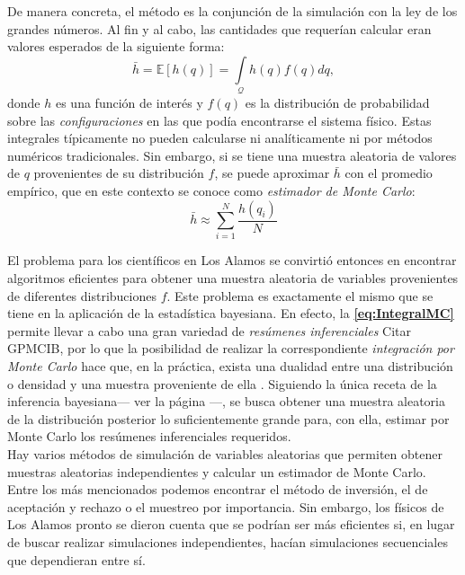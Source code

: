 De manera concreta, el método es la conjunción de la simulación con la ley de los grandes números. Al fin y al cabo, las cantidades que requerían calcular eran valores esperados de la siguiente forma: 
\begin{equation}
\label{eq:IntegralMC}
\bar{h} = \mathbb{E}[h(q)]=\int\limits_\mathcal{Q} h(q)f(q)dq ,
\end{equation} 
donde $h$ es una función de interés y $f(q)$ es la distribución de probabilidad sobre las \textit{configuraciones} en las que podía encontrarse el sistema físico. Estas integrales típicamente no pueden calcularse ni analíticamente ni por métodos numéricos tradicionales. Sin embargo, si se tiene una muestra aleatoria de valores de $q$ provenientes de su distribución $f$, se puede aproximar $\bar{h}$ con el promedio empírico, que en este contexto se conoce como \textit{estimador de Monte Carlo}: 
\begin{equation*}
\bar{h} \approx \sum\limits_{i=1}^N \dfrac{h(q_i)}{N}
\end{equation*}

El problema para los científicos en Los Alamos se convirtió entonces en encontrar algoritmos eficientes para obtener una muestra aleatoria de variables provenientes de diferentes distribuciones $f$. Este problema es exactamente el mismo que se tiene en la aplicación de la estadística bayesiana. En efecto, la \textbf{\ref{eq:IntegralMC}} permite llevar a cabo una gran variedad de \textit{resúmenes inferenciales} {\color{Red} Citar GPMCIB}, por lo que la posibilidad de realizar la correspondiente \textit{integración por Monte Carlo} hace que, en la práctica, exista una dualidad entre una distribución o densidad y una muestra proveniente de ella \parencite{SmithGelfand92}. Siguiendo la única receta de la inferencia bayesiana--- ver la página \pageref{receta_bayesiana}---, se busca obtener una muestra aleatoria de la distribución posterior lo suficientemente grande para, con ella, estimar por Monte Carlo los resúmenes inferenciales requeridos.\\

Hay varios métodos de simulación de variables aleatorias que permiten obtener muestras aleatorias independientes y calcular un estimador de Monte Carlo. Entre los más mencionados podemos encontrar el método de inversión, el de aceptación y rechazo o el muestreo por importancia. Sin embargo, los físicos de Los Alamos pronto se dieron cuenta que se podrían ser más eficientes si, en lugar de buscar realizar simulaciones independientes, hacían simulaciones secuenciales que dependieran entre sí. 

